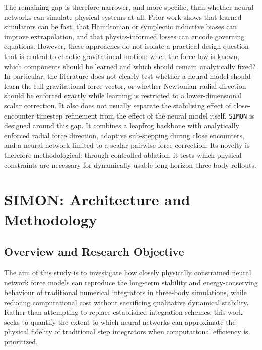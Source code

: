 \documentclass[12pt]{article}
\begin{document}
The remaining gap is therefore narrower, and more specific, than whether neural networks can simulate physical systems at all. Prior work shows that learned simulators can be fast, that Hamiltonian or symplectic inductive biases can improve extrapolation, and that physics-informed losses can encode governing equations. However, these approaches do not isolate a practical design question that is central to chaotic gravitational motion: when the force law is known, which components should be learned and which should remain analytically fixed? In particular, the literature does not clearly test whether a neural model should learn the full gravitational force vector, or whether Newtonian radial direction should be enforced exactly while learning is restricted to a lower-dimensional scalar correction. It also does not usually separate the stabilising effect of close-encounter timestep refinement from the effect of the neural model itself. \texttt{SIMON} is designed around this gap. It combines a leapfrog backbone with analytically enforced radial force direction, adaptive sub-stepping during close encounters, and a neural network limited to a scalar pairwise force correction. Its novelty is therefore methodological: through controlled ablation, it tests which physical constraints are necessary for dynamically usable long-horizon three-body rollouts.

\section{SIMON: Architecture and Methodology}
\label{sec:methodology}

\subsection{Overview and Research Objective}
\label{research_obj}

The aim of this study is to investigate how closely physically constrained neural network force models can reproduce the long-term stability and energy-conserving behaviour of traditional numerical integrators in three-body simulations, while reducing computational
cost without sacrificing qualitative dynamical stability. Rather than attempting to replace established integration schemes, this work seeks to quantify the extent to which neural networks can approximate the physical fidelity of traditional step integrators when computational efficiency is prioritized.
\end{document}
